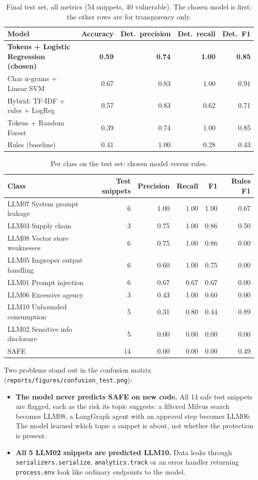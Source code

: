 \documentclass[11pt,a4paper]{article}
\newcommand{\code}[1]{\texttt{#1}}
\begin{document}
\begin{table}[H]
\centering\small
\begin{tabular}{l r r r r}
\toprule
Model & Accuracy & Det.\ precision & Det.\ recall & Det.\ F1 \\
\midrule
\textbf{Tokens + Logistic Regression (chosen)} & \textbf{0.59} & \textbf{0.74} & \textbf{1.00} & \textbf{0.85} \\
Char n-grams + Linear SVM & 0.67 & 0.83 & 1.00 & 0.91 \\
Hybrid: TF-IDF + rules + LogReg & 0.57 & 0.83 & 0.62 & 0.71 \\
Tokens + Random Forest & 0.39 & 0.74 & 1.00 & 0.85 \\
Rules (baseline) & 0.41 & 1.00 & 0.28 & 0.43 \\
\bottomrule
\end{tabular}
\caption{Final test set, all metrics (54 snippets, 40 vulnerable). The chosen model is
first; the other rows are for transparency only.}
\end{table}

\begin{table}[H]
\centering\small
\begin{tabular}{l r r r r r}
\toprule
Class & Test snippets & Precision & Recall & F1 & Rules F1 \\
\midrule
LLM07 System prompt leakage & 6 & 1.00 & 1.00 & 1.00 & 0.67 \\
LLM03 Supply chain & 3 & 0.75 & 1.00 & 0.86 & 0.50 \\
LLM08 Vector store weaknesses & 6 & 0.75 & 1.00 & 0.86 & 0.00 \\
LLM05 Improper output handling & 6 & 0.60 & 1.00 & 0.75 & 0.00 \\
LLM01 Prompt injection & 6 & 0.67 & 0.67 & 0.67 & 0.00 \\
LLM06 Excessive agency & 3 & 0.43 & 1.00 & 0.60 & 0.00 \\
LLM10 Unbounded consumption & 5 & 0.31 & 0.80 & 0.44 & 0.89 \\
LLM02 Sensitive info disclosure & 5 & 0.00 & 0.00 & 0.00 & 0.00 \\
SAFE & 14 & 0.00 & 0.00 & 0.00 & 0.49 \\
\bottomrule
\end{tabular}
\caption{Per class on the test set: chosen model versus rules.}
\end{table}

Two problems stand out in the confusion matrix (\code{reports/figures/confusion\_test.png}):
\begin{itemize}
  \item \textbf{The model never predicts SAFE on new code.} All 14 safe test snippets are
        flagged, each as the risk its topic suggests: a filtered Milvus search becomes
        LLM08, a LangGraph agent with an approval step becomes LLM06. The model learned
        which topic a snippet is about, not whether the protection is present.
  \item \textbf{All 5 LLM02 snippets are predicted LLM10.} Data leaks through
        \code{serializers.serialize}, \code{analytics.track} or an error handler returning
        \code{process.env} look like ordinary endpoints to the model.
\end{itemize}
\end{document}
